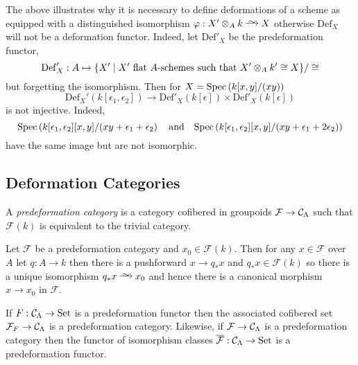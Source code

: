 \documentclass[12pt]{article}
\newcommand{\Set}{\mathrm{Set}}
\newcommand{\Def}{\mathrm{Def}}
\renewcommand{\F}{\mathcal{F}}
\begin{document}
\begin{rmk}
The above illustrates why it is necessary to define deformations of a scheme as equipped with a distinguished isomorphism $\varphi : X' \ot_A k \iso X$ otherwise $\Def_X$ will not be a deformation functor. Indeed, let $\Def'_X$ be the predeformation functor,
\[ \Def'_X : A \mapsto \{ X' \mid X' \text{ flat } A\text{-schemes such that } X' \ot_A k' \cong X \} / \cong \]
but forgetting the isomorphism. Then for $X = \mathrm{Spec}\left( k[x,y]/(xy) \right)$
\[ \Def_X'(k[\epsilon_1, \epsilon_2]) \to \Def'_X(k[\epsilon]) \times \Def'_X(k[\epsilon]) \]
is not injective. Indeed,  
\[ \mathrm{Spec}\left( k[\epsilon_1, \epsilon_2][x,y]/(xy + \epsilon_1 + \epsilon_2 \right) \quad \text{and} \quad \mathrm{Spec}\left( k[\epsilon_1, \epsilon_2][x,y]/(xy + \epsilon_1 + 2 \epsilon_2) \right) \]  
have the same image but are not isomorphic. 
\end{rmk}


\subsection{Deformation Categories}

\begin{defn}
A \textit{predeformation category} is a category cofibered in groupoids $\F \to \C_{\Lambda}$ such that $\F(k)$ is equivalent to the trivial category. 
\end{defn}

\begin{rmk}
Let $\F$ be a predeformation category and $x_0 \in \F(k)$. Then for any $x \in \F$ over $A$ let $q : A \to k$ then there is a pushforward $x \to q_* x$ and $q_* x \in \F(k)$ so there is a unique isomorphism $q_* x \iso x_0$ and hence there is a canonical morphism $x \to x_0$ in $\F$. 
\end{rmk}

\begin{rmk}
If $F : \C_\Lambda \to \Set$ is a predeformation functor then the associated cofibered set $\F_F \to \C_{\Lambda}$ is a predeformation category. Likewise, if $\F \to \C_\Lambda$ is a predeformation category then the functor of isomorphism classes $\overline{\F} : \C_{\Lambda} \to \Set$ is a predeformation functor. 
\end{rmk}
\end{document}

